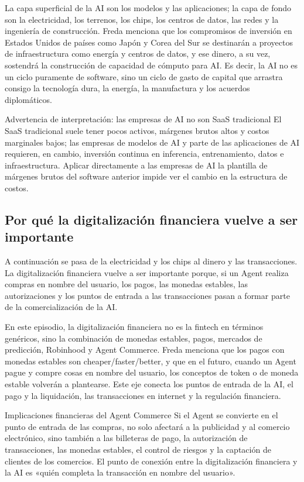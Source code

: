 \documentclass[a4paper]{article}
\begin{document}
La capa superficial de la AI son los modelos y las aplicaciones; la capa de fondo son la electricidad, los terrenos, los chips, los centros de datos, las redes y la ingeniería de construcción. Freda menciona que los compromisos de inversión en Estados Unidos de países como Japón y Corea del Sur se destinarán a proyectos de infraestructura como energía y centros de datos, y ese dinero, a su vez, sostendrá la construcción de capacidad de cómputo para AI. Es decir, la AI no es un ciclo puramente de software, sino un ciclo de gasto de capital que arrastra consigo la tecnología dura, la energía, la manufactura y los acuerdos diplomáticos.

\begin{warningbox}{Advertencia de interpretación: las empresas de AI no son SaaS tradicional}
El SaaS tradicional suele tener pocos activos, márgenes brutos altos y costos marginales bajos; las empresas de modelos de AI y parte de las aplicaciones de AI requieren, en cambio, inversión continua en inferencia, entrenamiento, datos e infraestructura. Aplicar directamente a las empresas de AI la plantilla de márgenes brutos del software anterior impide ver el cambio en la estructura de costos.
\end{warningbox}

\subsection{Por qué la digitalización financiera vuelve a ser importante}

A continuación se pasa de la electricidad y los chips al dinero y las transacciones. La digitalización financiera vuelve a ser importante porque, si un Agent realiza compras en nombre del usuario, los pagos, las monedas estables, las autorizaciones y los puntos de entrada a las transacciones pasan a formar parte de la comercialización de la AI.

En este episodio, la digitalización financiera no es la fintech en términos genéricos, sino la combinación de monedas estables, pagos, mercados de predicción, Robinhood y Agent Commerce. Freda menciona que los pagos con monedas estables son cheaper/faster/better, y que en el futuro, cuando un Agent pague y compre cosas en nombre del usuario, los conceptos de token o de moneda estable volverán a plantearse. Este eje conecta los puntos de entrada de la AI, el pago y la liquidación, las transacciones en internet y la regulación financiera.

\begin{importantbox}{Implicaciones financieras del Agent Commerce}
Si el Agent se convierte en el punto de entrada de las compras, no solo afectará a la publicidad y al comercio electrónico, sino también a las billeteras de pago, la autorización de transacciones, las monedas estables, el control de riesgos y la captación de clientes de los comercios. El punto de conexión entre la digitalización financiera y la AI es «quién completa la transacción en nombre del usuario».
\end{importantbox}
\end{document}
